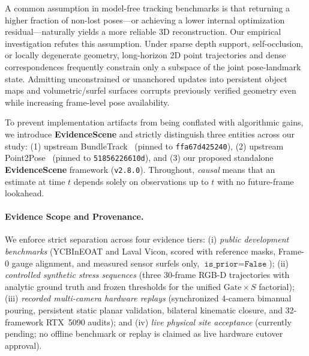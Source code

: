 \documentclass{evidencescene}
\begin{document}
A common assumption in model-free tracking benchmarks is that returning a higher fraction of non-lost poses---or achieving a lower internal optimization residual---naturally yields a more reliable 3D reconstruction. Our empirical investigation refutes this assumption. Under sparse depth support, self-occlusion, or locally degenerate geometry, long-horizon 2D point trajectories and dense correspondences frequently constrain only a subspace of the joint pose-landmark state. Admitting unconstrained or unanchored updates into persistent object maps and volumetric/surfel surfaces corrupts previously verified geometry even while increasing frame-level pose availability.

To prevent implementation artifacts from being conflated with algorithmic gains, we introduce \textbf{EvidenceScene} and strictly distinguish three entities across our study: (1) upstream BundleTrack~\cite{bundletrack} (pinned to \texttt{ffa67d425240}), (2) upstream Point2Pose~\cite{point2pose} (pinned to \texttt{51856226610d}), and (3) our proposed standalone \textbf{EvidenceScene} framework (\texttt{v2.8.0}). Throughout, \emph{causal} means that an estimate at time $t$ depends solely on observations up to $t$ with no future-frame lookahead.

\paragraph{Evidence Scope and Provenance.} We enforce strict separation across four evidence tiers: (i) \emph{public development benchmarks} (YCBInEOAT and Laval Vicon, scored with reference masks, Frame-0 gauge alignment, and measured sensor surfels only, $\texttt{is\_prior}=\texttt{False}$); (ii) \emph{controlled synthetic stress sequences} (three $30$-frame RGB-D trajectories with analytic ground truth and frozen thresholds for the unified $\text{Gate}\times S$ factorial); (iii) \emph{recorded multi-camera hardware replays} (synchronized 4-camera bimanual pouring, persistent static planar validation, bilateral kinematic closure, and 32-framework RTX~5090 audits); and (iv) \emph{live physical site acceptance} (currently pending; no offline benchmark or replay is claimed as live hardware cutover approval).
\end{document}
